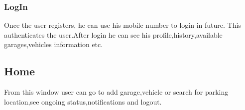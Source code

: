 \documentclass[12pt, english]{article}
\begin{document}


\subsubsection{LogIn}
Once the user registers, he can use his mobile number to login in future. This authenticates the user.After login he can see his profile,history,available garages,vehicles information etc.
\newpage
\subsection{Home}
From this window user can go to add garage,vehicle or search for parking location,see ongoing status,notifications and logout.
\newpage
\end{document}
